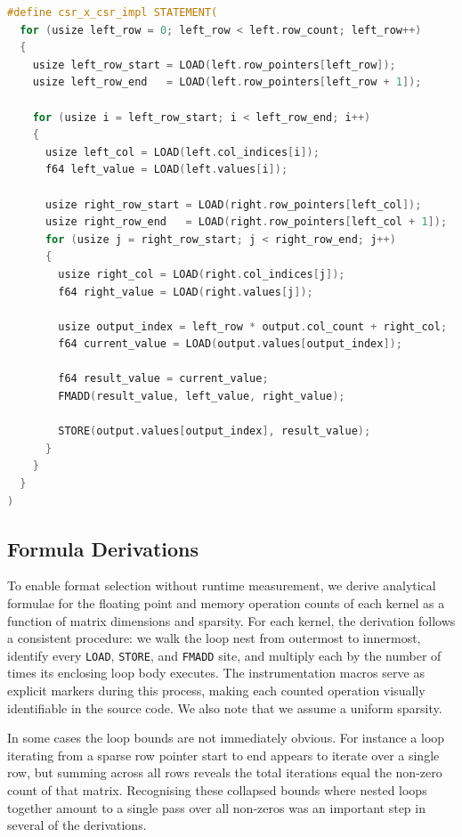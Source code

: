 \documentclass[sigconf]{acmart}
\begin{document}
\begin{lstlisting}[language=C, caption={Implementation macro example, backslashes ommitted for formatting, STATEMENT expands to a do while()}]
#define csr_x_csr_impl STATEMENT(
  for (usize left_row = 0; left_row < left.row_count; left_row++)
  {
    usize left_row_start = LOAD(left.row_pointers[left_row]);
    usize left_row_end   = LOAD(left.row_pointers[left_row + 1]);

    for (usize i = left_row_start; i < left_row_end; i++)
    {
      usize left_col = LOAD(left.col_indices[i]);
      f64 left_value = LOAD(left.values[i]);

      usize right_row_start = LOAD(right.row_pointers[left_col]);
      usize right_row_end   = LOAD(right.row_pointers[left_col + 1]);
      for (usize j = right_row_start; j < right_row_end; j++)
      {
        usize right_col = LOAD(right.col_indices[j]);
        f64 right_value = LOAD(right.values[j]);

        usize output_index = left_row * output.col_count + right_col;
        f64 current_value = LOAD(output.values[output_index]);

        f64 result_value = current_value;
        FMADD(result_value, left_value, right_value);

        STORE(output.values[output_index], result_value);
      }
    }
  }
)
\end{lstlisting}

\subsection{Formula Derivations}
To enable format selection without runtime measurement, we derive analytical formulae for the floating point and memory operation counts of each kernel as a function of matrix dimensions and sparsity. For each kernel, the derivation follows a consistent procedure: we walk the loop nest from outermost to innermost, identify every \texttt{LOAD}, \texttt{STORE}, and \texttt{FMADD} site, and multiply each by the number of times its enclosing loop body executes. The instrumentation macros serve as explicit markers during this process, making each counted operation visually identifiable in the source code. We also note that we assume a uniform sparsity.

In some cases the loop bounds are not immediately obvious. For instance a loop iterating from a sparse row pointer start to end appears to iterate over a single row, but summing across all rows reveals the total iterations equal the non-zero count of that matrix. Recognising these collapsed bounds where nested loops together amount to a single pass over all non-zeros was an important step in several of the derivations.
\end{document}
